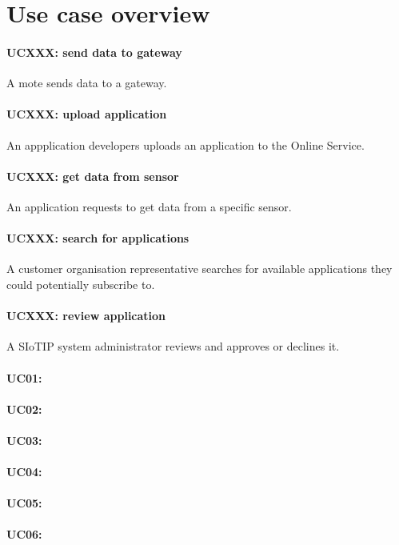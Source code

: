 \section{Use case overview}\label{sec:uc_overview}

\paragraph{UCXXX: send data to gateway}
A mote sends data to a gateway.
\paragraph{UCXXX: upload application}
An appplication developers uploads an application to the Online Service.
\paragraph{UCXXX: get data from sensor}
An application requests to get data from a specific sensor.
\paragraph{UCXXX: search for applications}
A customer organisation representative searches for available applications they
could potentially subscribe to.
\paragraph{UCXXX: review application}
A SIoTIP system administrator reviews and approves or declines it.
\paragraph{UC01: }
\paragraph{UC02: }
\paragraph{UC03: }
\paragraph{UC04: }
\paragraph{UC05: }
\paragraph{UC06: }
